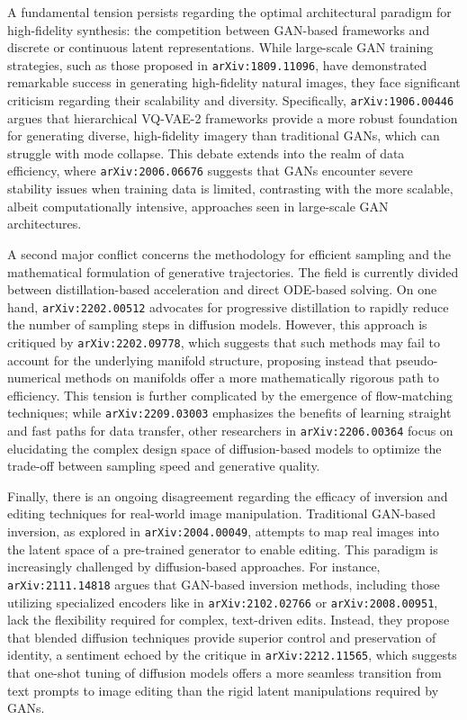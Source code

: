 \documentclass[11pt]{article}
\begin{document}
A fundamental tension persists regarding the optimal architectural paradigm for high-fidelity synthesis: the competition between GAN-based frameworks and discrete or continuous latent representations. While large-scale GAN training strategies, such as those proposed in \texttt{arXiv:1809.11096}, have demonstrated remarkable success in generating high-fidelity natural images, they face significant criticism regarding their scalability and diversity. Specifically, \texttt{arXiv:1906.00446} argues that hierarchical VQ-VAE-2 frameworks provide a more robust foundation for generating diverse, high-fidelity imagery than traditional GANs, which can struggle with mode collapse. This debate extends into the realm of data efficiency, where \texttt{arXiv:2006.06676} suggests that GANs encounter severe stability issues when training data is limited, contrasting with the more scalable, albeit computationally intensive, approaches seen in large-scale GAN architectures.

A second major conflict concerns the methodology for efficient sampling and the mathematical formulation of generative trajectories. The field is currently divided between distillation-based acceleration and direct ODE-based solving. On one hand, \texttt{arXiv:2202.00512} advocates for progressive distillation to rapidly reduce the number of sampling steps in diffusion models. However, this approach is critiqued by \texttt{arXiv:2202.09778}, which suggests that such methods may fail to account for the underlying manifold structure, proposing instead that pseudo-numerical methods on manifolds offer a more mathematically rigorous path to efficiency. This tension is further complicated by the emergence of flow-matching techniques; while \texttt{arXiv:2209.03003} emphasizes the benefits of learning straight and fast paths for data transfer, other researchers in \texttt{arXiv:2206.00364} focus on elucidating the complex design space of diffusion-based models to optimize the trade-off between sampling speed and generative quality.

Finally, there is an ongoing disagreement regarding the efficacy of inversion and editing techniques for real-world image manipulation. Traditional GAN-based inversion, as explored in \texttt{arXiv:2004.00049}, attempts to map real images into the latent space of a pre-trained generator to enable editing. This paradigm is increasingly challenged by diffusion-based approaches. For instance, \texttt{arXiv:2111.14818} argues that GAN-based inversion methods, including those utilizing specialized encoders like in \texttt{arXiv:2102.02766} or \texttt{arXiv:2008.00951}, lack the flexibility required for complex, text-driven edits. Instead, they propose that blended diffusion techniques provide superior control and preservation of identity, a sentiment echoed by the critique in \texttt{arXiv:2212.11565}, which suggests that one-shot tuning of diffusion models offers a more seamless transition from text prompts to image editing than the rigid latent manipulations required by GANs.
\end{document}
